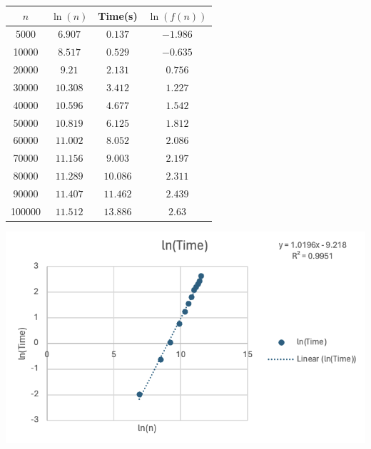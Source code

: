 \documentclass{article}
\begin{document}
\begin{minipage}{0.4\textwidth} %
    \centering

    
    
    \begin{tabular}{c|c|c|c}
        $n$ & $\ln(n)$ & Time(s) & $\ln(f(n))$ \\ \hline
        5000 & $6.907$ & $0.137$ & $-1.986$ \\ \hline
        10000 & $8.517$ & $0.529$ & $-0.635$  \\ \hline
        20000 & $9.21$ & $2.131$ & $0.756$\\ \hline
        30000 & $10.308$ & $3.412$ & $1.227$\\ \hline
        40000 & $10.596$ & $4.677$ & $1.542$\\ \hline
        50000 & $10.819$ & $6.125$ & $1.812$\\ \hline
        60000 & $11.002$ & $8.052$ & $2.086$\\ \hline
        70000 & $11.156$ & $9.003$ & $2.197$\\ \hline
        80000 & $11.289$ & $10.086$ & $2.311$\\ \hline
        90000 & $11.407$ & $11.462$ & $2.439$\\ \hline
        100000 & $11.512$ & $13.886$ & $2.63$\\
    \end{tabular}
    
\end{minipage}%
\begin{minipage}{0.6\textwidth} %

    

    \centering
    \includegraphics[width=1\linewidth]{Graphs/Linear.png} %

     
    
\end{minipage} \\
\end{document}
